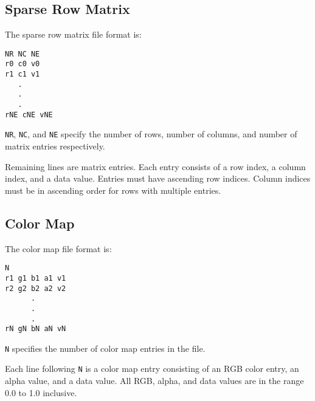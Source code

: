 \subsection{Sparse Row Matrix}
\label{sec:sparse_row_matrix}

The sparse row matrix file format is:

\begin{verbatim}
NR NC NE
r0 c0 v0
r1 c1 v1
   .
   .
   .
rNE cNE vNE
\end{verbatim}

\verb|NR|, \verb|NC|, and \verb|NE| specify the number of rows, number
of columns, and number of matrix entries respectively.  

Remaining lines are matrix entries.  Each entry consists of a row
index, a column index, and a data value.  Entries must have ascending
row indices. Column indices must be in ascending order for rows with
multiple entries.

\subsection{Color Map}
\label{sec:colormap_fmt}

The color map file format is:

\begin{verbatim}
N
r1 g1 b1 a1 v1
r2 g2 b2 a2 v2
      .
      .
      .
rN gN bN aN vN
\end{verbatim}


\verb|N| specifies the number of color map entries in the file.

Each line following \verb|N| is a color map entry consisting of an RGB
color entry, an alpha value, and a data value.  All RGB, alpha, and
data values are in the range 0.0 to 1.0 inclusive.


